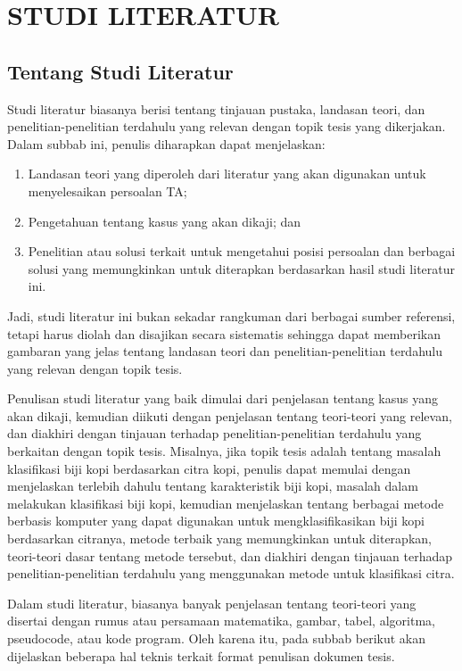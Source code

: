 \cleardoublepage %
\chapter{STUDI LITERATUR}
\label{chap:studi-literatur}
\section{Tentang Studi Literatur}
Studi literatur biasanya berisi tentang tinjauan pustaka, landasan teori, dan penelitian-penelitian terdahulu yang relevan dengan topik tesis yang dikerjakan.
Dalam subbab ini, penulis diharapkan dapat menjelaskan:
\begin{enumerate}
  \item Landasan teori yang diperoleh dari literatur yang akan digunakan untuk menyelesaikan persoalan TA;
  \item Pengetahuan tentang kasus yang akan dikaji; dan
  \item Penelitian atau solusi terkait untuk mengetahui posisi persoalan dan berbagai solusi yang memungkinkan untuk diterapkan berdasarkan hasil studi literatur ini.
\end{enumerate}
Jadi, studi literatur ini bukan sekadar rangkuman dari berbagai sumber referensi, tetapi harus diolah dan disajikan secara sistematis sehingga dapat memberikan gambaran yang jelas tentang landasan teori dan penelitian-penelitian terdahulu yang relevan dengan topik tesis.

Penulisan studi literatur yang baik dimulai dari penjelasan tentang kasus yang akan dikaji, kemudian diikuti dengan penjelasan tentang teori-teori yang relevan, dan diakhiri dengan tinjauan terhadap penelitian-penelitian terdahulu yang berkaitan dengan topik tesis.
Misalnya, jika topik tesis adalah tentang masalah klasifikasi biji kopi berdasarkan citra kopi, 
penulis dapat memulai dengan menjelaskan terlebih dahulu tentang karakteristik biji kopi, masalah dalam melakukan klasifikasi biji kopi, 
kemudian menjelaskan tentang berbagai metode berbasis komputer yang dapat digunakan untuk mengklasifikasikan biji kopi berdasarkan citranya, 
metode terbaik yang memungkinkan untuk diterapkan, teori-teori dasar tentang metode tersebut, dan diakhiri dengan tinjauan terhadap penelitian-penelitian terdahulu yang menggunakan metode untuk klasifikasi citra.

Dalam studi literatur, biasanya banyak penjelasan tentang teori-teori yang disertai dengan rumus atau persamaan matematika, gambar, tabel, algoritma, pseudocode, atau kode program.
Oleh karena itu, pada subbab berikut akan dijelaskan beberapa hal teknis terkait format penulisan dokumen tesis.

